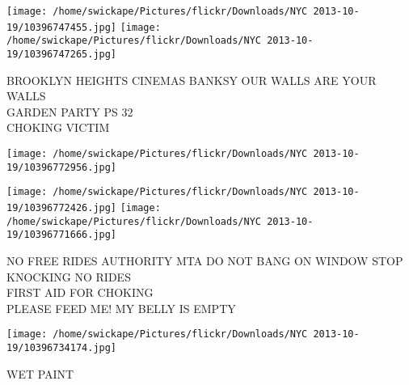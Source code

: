 \documentclass[10pt,letterpaper]{article}
\begin{document}
\vspace{0.25in}
\texttt{[image: /home/swickape/Pictures/flickr/Downloads/NYC 2013-10-19/10396747455.jpg]}
\texttt{[image: /home/swickape/Pictures/flickr/Downloads/NYC 2013-10-19/10396747265.jpg]}

BROOKLYN HEIGHTS CINEMAS BANKSY OUR WALLS ARE YOUR WALLS\\
GARDEN PARTY PS 32\\
CHOKING VICTIM\\
\pagebreak

\texttt{[image: /home/swickape/Pictures/flickr/Downloads/NYC 2013-10-19/10396772956.jpg]}

\vspace{0.25in}
\texttt{[image: /home/swickape/Pictures/flickr/Downloads/NYC 2013-10-19/10396772426.jpg]}
\texttt{[image: /home/swickape/Pictures/flickr/Downloads/NYC 2013-10-19/10396771666.jpg]}

NO FREE RIDES AUTHORITY MTA DO NOT BANG ON WINDOW STOP KNOCKING NO RIDES\\
FIRST AID FOR CHOKING\\
PLEASE FEED ME! MY BELLY IS EMPTY\\
\pagebreak

\texttt{[image: /home/swickape/Pictures/flickr/Downloads/NYC 2013-10-19/10396734174.jpg]}

WET PAINT\\
\pagebreak
\end{document}
